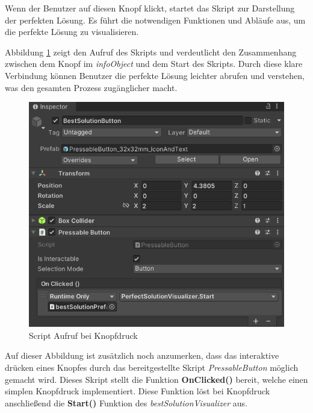 Wenn der Benutzer auf diesen Knopf klickt, startet das Skript zur Darstellung der perfekten Lösung. Es führt die notwendigen
Funktionen und Abläufe aus, um die perfekte Lösung zu visualisieren.

Abbildung \ref{fig:ScrAuf} zeigt den Aufruf des Skripts und verdeutlicht den Zusammenhang zwischen dem Knopf im \textit{infoObject}
und dem Start des Skripts. Durch diese klare Verbindung können Benutzer die perfekte Lösung leichter abrufen und verstehen,
was den gesamten Prozess zugänglicher macht.

\begin{figure}[H]
\centering
\includegraphics[scale=0.8]{images/perfSolBut}
\caption{Script Aufruf bei Knopfdruck}
\label{fig:ScrAuf}
\end{figure}

Auf dieser Abbildung ist zusätzlich noch anzumerken, dass das interaktive drücken eines Knopfes durch das bereitgestellte
Skript \textit{PressableButton} möglich gemacht wird. Dieses Skript stellt die Funktion \textbf{OnClicked()} bereit, welche
einen simplen Knopfdruck implementiert. Diese Funktion löst bei Knopfdruck anschließend die \textbf{Start()} Funktion des
\textit{bestSolutionVisualizer} aus.

